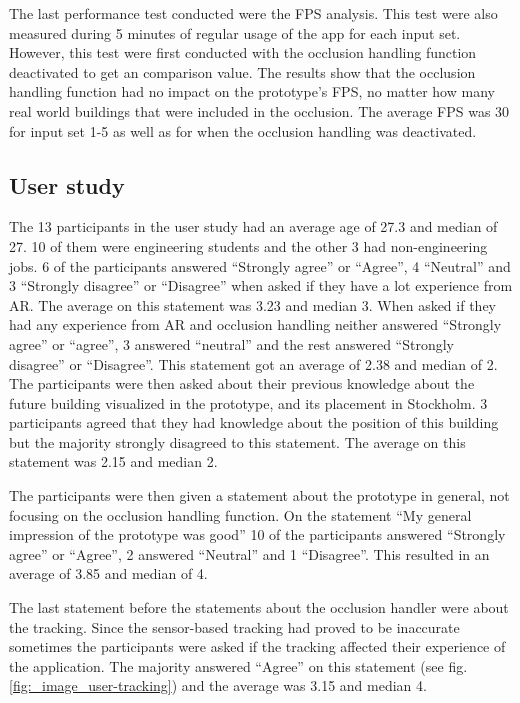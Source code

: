 The last performance test conducted were the FPS analysis. This test were also measured during 5 minutes of regular usage of the app for each input set. However, this test were first conducted with the occlusion handling function deactivated to get an comparison value. The results show that the occlusion handling function had no impact on the prototype's FPS, no matter how many real world buildings that were included in the occlusion. The average FPS was 30 for input set 1-5 as well as for when the occlusion handling was deactivated.

\subsection{User study}

The 13 participants in the user study had an average age of 27.3 and median of 27. 10 of them were engineering students and the other 3 had non-engineering jobs. 6 of the participants answered ``Strongly agree'' or ``Agree'', 4 ``Neutral'' and 3 ``Strongly disagree'' or ``Disagree'' when asked if they have a lot experience from AR. The average on this statement was 3.23 and median 3. When asked if they had any experience from AR and occlusion handling neither answered ``Strongly agree'' or ``agree'', 3 answered ``neutral'' and the rest answered ``Strongly disagree'' or ``Disagree''. This statement got an average of 2.38 and median of 2. The participants were then asked about their previous knowledge about the future building visualized in the prototype, and its placement in Stockholm. 3 participants agreed that they had knowledge about the position of this building but the majority strongly disagreed to this statement. The average on this statement was 2.15 and median 2.

The participants were then given a statement about the prototype in general, not focusing on the occlusion handling function. On the statement ``My general impression of the prototype was good'' 10 of the participants answered ``Strongly agree'' or ``Agree'', 2 answered ``Neutral'' and 1 ``Disagree''. This resulted in an average of 3.85 and median of 4. 

The last statement before the statements about the occlusion handler were about the tracking. Since the sensor-based tracking had proved to be inaccurate sometimes the participants were asked if the tracking affected their experience of the application. The majority answered ``Agree'' on this statement (see fig. \ref{fig:_image_user-tracking}) and the average was 3.15 and median 4.

